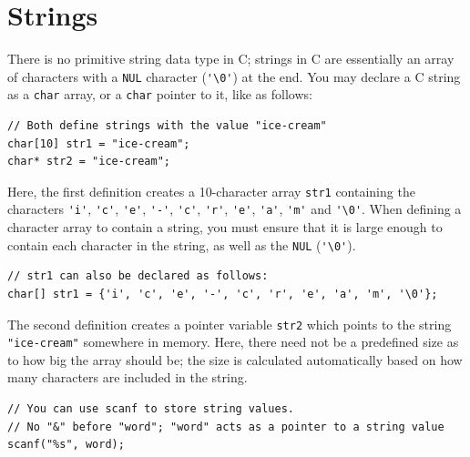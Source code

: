\section{Strings}

There is no primitive string data type in C; strings in C are essentially an array of characters with a \verb|NUL| character (\verb|'\0'|) at the end.
You may declare a C string as a \verb|char| array, or a \verb|char| pointer to it, like as follows:


\begin{verbatim}
// Both define strings with the value "ice-cream" 
char[10] str1 = "ice-cream";
char* str2 = "ice-cream";
\end{verbatim}

Here, the first definition creates a 10-character array \verb|str1| containing the characters 
\verb|'i'|, \verb|'c'|, \verb|'e'|, \verb|'-'|, \verb|'c'|, \verb|'r'|, \verb|'e'|, \verb|'a'|, \verb|'m'| and \verb|'\0'|.
When defining a character array to contain a string, you must ensure that it is large enough to contain each character in the string, as well as the \verb|NUL| (\verb|'\0'|).

\begin{verbatim}
// str1 can also be declared as follows:
char[] str1 = {'i', 'c', 'e', '-', 'c', 'r', 'e', 'a', 'm', '\0'};
\end{verbatim}

The second definition creates a pointer variable \verb|str2| which points to the string \verb|"ice-cream"| somewhere in memory.
Here, there need not be a predefined size as to how big the array should be; the size is calculated automatically based on how many characters are included in the string.

\begin{verbatim}
// You can use scanf to store string values.
// No "&" before "word"; "word" acts as a pointer to a string value
scanf("%s", word); 
\end{verbatim}



